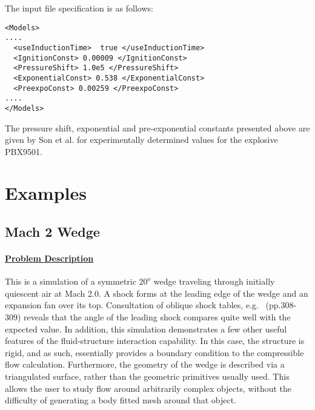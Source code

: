 The input file specification is as follows:
\begin{lstlisting}
<Models>
....
  <useInductionTime>  true </useInductionTime>
  <IgnitionConst> 0.00009 </IgnitionConst>
  <PressureShift> 1.0e5 </PressureShift>
  <ExponentialConst> 0.538 </ExponentialConst>
  <PreexpoConst> 0.00259 </PreexpoConst>
....
</Models> 
\end{lstlisting}

The pressure shift, exponential and pre-exponential constants presented above are given by Son et al. \cite{flameProp} for experimentally determined values for the explosive PBX9501.


\newpage

\section{Examples} \label {Sec:MPMICE_EXAMPLES}

\subsection*{\center Mach 2 Wedge}
\paragraph*{\underline{Problem Description}}
This is a simulation of a symmetric $20^o$ wedge traveling through initially
quiescent air at Mach 2.0.  A shock forms at the leading edge of the
wedge and an expansion fan over its top.  Consultation of oblique shock
tables, e.g.~\cite{ref:Saad} (pp.308-309) reveals that the angle of the leading
shock compares quite well with the expected value.  In addition, this
simulation demonstrates a few other useful features of the fluid-structure
interaction capability.  In this case, the structure is rigid, and as
such, essentially provides a boundary condition to the compressible flow
calculation.  Furthermore, the geometry of the wedge is described via a
triangulated surface, rather than the geometric primitives usually used.
This allows the user to study flow around arbitrarily complex objects,
without the difficulty of generating a body fitted mesh around that object.

